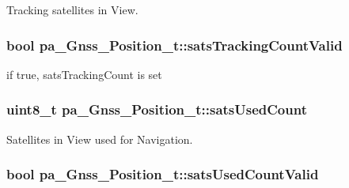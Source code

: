 Tracking satellites in View. 

\subsubsection[{\texorpdfstring{sats\+Tracking\+Count\+Valid}{satsTrackingCountValid}}]{\setlength{\rightskip}{0pt plus 5cm}bool pa\+\_\+\+Gnss\+\_\+\+Position\+\_\+t\+::sats\+Tracking\+Count\+Valid}\hypertarget{structpa___gnss___position__t_a45facf50720ffea4d20ecb8568a28e74}{}\label{structpa___gnss___position__t_a45facf50720ffea4d20ecb8568a28e74}


if true, sats\+Tracking\+Count is set 

\subsubsection[{\texorpdfstring{sats\+Used\+Count}{satsUsedCount}}]{\setlength{\rightskip}{0pt plus 5cm}uint8\+\_\+t pa\+\_\+\+Gnss\+\_\+\+Position\+\_\+t\+::sats\+Used\+Count}\hypertarget{structpa___gnss___position__t_a3efe9ffc9992f92386c45b9b3f362e7e}{}\label{structpa___gnss___position__t_a3efe9ffc9992f92386c45b9b3f362e7e}


Satellites in View used for Navigation. 

\subsubsection[{\texorpdfstring{sats\+Used\+Count\+Valid}{satsUsedCountValid}}]{\setlength{\rightskip}{0pt plus 5cm}bool pa\+\_\+\+Gnss\+\_\+\+Position\+\_\+t\+::sats\+Used\+Count\+Valid}\hypertarget{structpa___gnss___position__t_aaa1c82db41aee5d1ea1751676c64cab7}{}\label{structpa___gnss___position__t_aaa1c82db41aee5d1ea1751676c64cab7}



